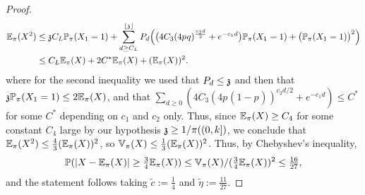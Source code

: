 \begin{proof}
\begin{align*}
\EE_{\pi}(X^2) &\le \ss C_L \P_{\pi}(X_1=1)+ \sum_{d \ge C_L}^{\lfloor \ss \rfloor} P_d \Big( \big(4C_3(4p_{}q)^{\frac{c_2 d}{2}}+e^{-c_1d}\big)\P_{\pi}(X_1=1)+\big(\P_{\pi}(X_1=1)\big)^2\Big)
\\
& \le C_L\EE_{\pi}(X)+2C^{*}\EE_{\pi}(X)+(\EE_{\pi}(X))^2.%
\end{align*}
where for the second inequality we used that $P_d \le \ss$ and then that $\ss \P_{\pi}(X_1=1)\le 2\EE_{\pi}(X)$, and that $\sum_{d\ge 0} (4C_3(4p_{}(1-p_{}))^{c_2 d/2} +e^{-c_1d})\le C^{*}$
for some $C^{*}$ depending on $c_1$ and $c_2$ only. %
Thus, since $\EE_{\pi}(X) \ge C_4$ for some constant $C_4$ large by our hypothesis $\ss\ge 1/\pi((0,k])$, we conclude that  $\EE_{\pi}(X^2)\le \frac43 (\EE_{\pi}(X))^2$, so
$\Var_{\pi}(X)\le \frac13 (\EE_{\pi}(X))^2$.
Thus, by Chebyshev's inequality,
$$
\P(|X-\EE_{\pi}(X)| \ge \tfrac34 \EE_{\pi}(X)) \le \Var_{\pi}(X)/(\tfrac34\EE_{\pi}(X))^2 \le \tfrac{16}{27},
$$
and the statement follows taking $\widetilde{c}:=\frac14$ and $\widetilde{\eta}:=\frac{11}{27}$.
\end{proof}



